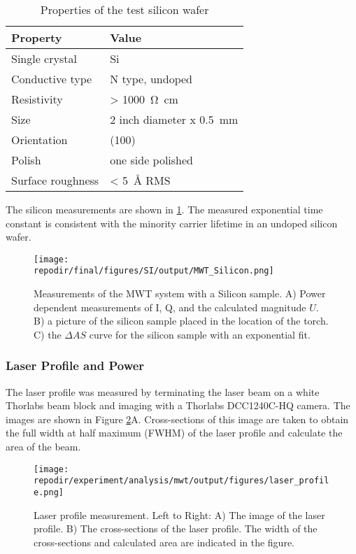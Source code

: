 \begin{table}[h]
\centering
\begin{tabular}{|l|l|}
\hline
Property & Value \\
\hline
Single crystal & Si \\
Conductive type & N type, undoped \\
Resistivity & > \SI{1000}{\ohm\centi\meter} \\
Size & 2 inch diameter x \SI{0.5}{\milli\meter} \\
Orientation & (100) \\
Polish & one side polished \\
Surface roughness & < \SI{5}{\angstrom} RMS \\
\hline
\end{tabular}
\caption{Properties of the test silicon wafer}
\label{table:material_properties}
\end{table}

The silicon measurements are shown in \ref{fig:SI_MWT_Silicon}. The measured exponential time constant is consistent with the minority carrier lifetime in an undoped silicon wafer. \cite{tyagiMINORITYCARRIERRECOMBINATION, delalamoModellingMinoritycarrierTransport1987} %

\begin{figure}[]
\centering
\texttt{[image: \\repodir/final/figures/SI/output/MWT\_Silicon.png]}
\caption{Measurements of the MWT system with a Silicon sample. A) Power dependent measurements of I, Q, and the calculated magnitude $U$. B) a picture of the silicon sample placed in the location of the torch. C) the $\Delta AS$ curve for the silicon sample with an exponential fit. }
\label{fig:SI_MWT_Silicon}
\end{figure}

\clearpage
\subsubsection{Laser Profile and Power}

The laser profile was measured by terminating the laser beam on a white Thorlabs beam block and imaging with a Thorlabs DCC1240C-HQ camera. The images are shown in Figure \ref{fig:SI_Laser_Profile}A. Cross-sections of this image are taken to obtain the full width at half maximum (FWHM) of the laser profile and calculate the area of the beam. 

\begin{figure}[H]
\centering
\texttt{[image: \\repodir/experiment/analysis/mwt/output/figures/laser\_profile.png]}
\caption{Laser profile measurement. Left to Right: A) The image of the laser profile. B) The cross-sections of the laser profile. The width of the cross-sections and calculated area are indicated in the figure.}
\label{fig:SI_Laser_Profile}
\end{figure}

